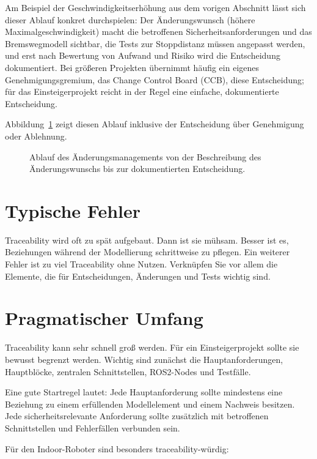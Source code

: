 Am Beispiel der Geschwindigkeitserhöhung aus dem vorigen Abschnitt lässt sich dieser Ablauf konkret durchspielen: Der Änderungswunsch (höhere Maximalgeschwindigkeit) macht die betroffenen Sicherheitsanforderungen und das Bremswegmodell sichtbar, die Tests zur Stoppdistanz müssen angepasst werden, und erst nach Bewertung von Aufwand und Risiko wird die Entscheidung dokumentiert. Bei größeren Projekten übernimmt häufig ein eigenes Genehmigungsgremium, das Change Control Board (CCB), diese Entscheidung; für das Einsteigerprojekt reicht in der Regel eine einfache, dokumentierte Entscheidung.

Abbildung~\ref{fig:kap20-aenderungsmanagement-ablauf} zeigt diesen Ablauf inklusive der Entscheidung über Genehmigung oder Ablehnung.

\begin{figure}[H]
  \centering
  \caption{Ablauf des Änderungsmanagements von der Beschreibung des Änderungswunschs bis zur dokumentierten Entscheidung.}
  \label{fig:kap20-aenderungsmanagement-ablauf}
\end{figure}

\section{Typische Fehler}
Traceability wird oft zu spät aufgebaut. Dann ist sie mühsam. Besser ist es, Beziehungen während der Modellierung schrittweise zu pflegen. Ein weiterer Fehler ist zu viel Traceability ohne Nutzen. Verknüpfen Sie vor allem die Elemente, die für Entscheidungen, Änderungen und Tests wichtig sind.

\section{Pragmatischer Umfang}
Traceability kann sehr schnell groß werden. Für ein Einsteigerprojekt sollte sie bewusst begrenzt werden. Wichtig sind zunächst die Hauptanforderungen, Hauptblöcke, zentralen Schnittstellen, ROS2-Nodes und Testfälle.

Eine gute Startregel lautet: Jede Hauptanforderung sollte mindestens eine Beziehung zu einem erfüllenden Modellelement und einem Nachweis besitzen. Jede sicherheitsrelevante Anforderung sollte zusätzlich mit betroffenen Schnittstellen und Fehlerfällen verbunden sein.

Für den Indoor-Roboter sind besonders traceability-würdig:

